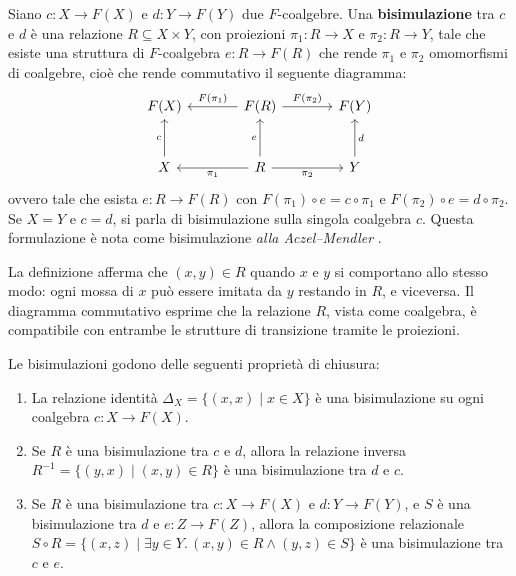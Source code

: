 \begin{definition}[Bisimulazione]
  Siano \(c : X \to F(X)\) e \(d : Y \to F(Y)\) due \(F\)-coalgebre. Una \textbf{bisimulazione} tra \(c\) e \(d\) è una relazione \(R \subseteq X \times Y\), con proiezioni \(\pi_1 : R \to X\) e \(\pi_2 : R \to Y\), tale che esiste una struttura di \(F\)-coalgebra \(e : R \to F(R)\) che rende \(\pi_1\) e \(\pi_2\) omomorfismi di coalgebre, cioè che rende commutativo il seguente diagramma:
  \[
    \begin{tikzcd}[column sep=large, row sep=large]
      F(X) & F(R) \arrow[l, "F(\pi_1)"'] \arrow[r, "F(\pi_2)"] & F(Y) \\
      X \arrow[u, "c"] & R \arrow[u, "e"] \arrow[l, "\pi_1"] \arrow[r, "\pi_2"'] & Y \arrow[u, "d"']
    \end{tikzcd}
  \]
  ovvero tale che esista \(e : R \to F(R)\) con \(F(\pi_1) \circ e = c \circ \pi_1\) e \(F(\pi_2) \circ e = d \circ \pi_2\). Se \(X = Y\) e \(c = d\), si parla di bisimulazione sulla singola coalgebra \(c\). Questa formulazione è nota come bisimulazione \textit{alla Aczel--Mendler} \cite{jacobs2017}.
\end{definition}

La definizione afferma che \((x, y) \in R\) quando \(x\) e \(y\) si comportano allo stesso modo: ogni mossa di \(x\) può essere imitata da \(y\) restando in \(R\), e viceversa. Il diagramma commutativo esprime che la relazione \(R\), vista come coalgebra, è compatibile con entrambe le strutture di transizione tramite le proiezioni.

\begin{proposition}
  Le bisimulazioni godono delle seguenti proprietà di chiusura:
  \begin{enumerate}
    \item La relazione identità \(\Delta_X = \{(x, x) \mid x \in X\}\) è una bisimulazione su ogni coalgebra \(c : X \to F(X)\).
    \item Se \(R\) è una bisimulazione tra \(c\) e \(d\), allora la relazione inversa \(R^{-1} = \{(y, x) \mid (x, y) \in R\}\) è una bisimulazione tra \(d\) e \(c\).
    \item Se \(R\) è una bisimulazione tra \(c : X \to F(X)\) e \(d : Y \to F(Y)\), e \(S\) è una bisimulazione tra \(d\) e \(e : Z \to F(Z)\), allora la composizione relazionale \(S \circ R = \{(x, z) \mid \exists y \in Y.\, (x,y) \in R \wedge (y,z) \in S\}\) è una bisimulazione tra \(c\) e \(e\).
  \end{enumerate}
\end{proposition}

